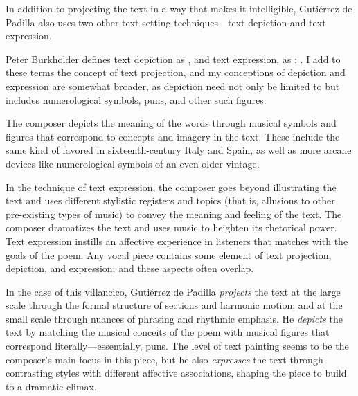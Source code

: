 
In addition to projecting the text in a way that makes it intelligible,
Gutiérrez de Padilla also uses two other text-setting techniques---text
depiction and text expression.%
\begin{Footnote}
    Peter Burkholder defines text depiction as , and text expression, as
    : 
    \Autocite[207]{Burkholder:History}.
    I add to these terms the concept of text projection, and my conceptions of
    depiction and expression are somewhat broader, as depiction need not only
    be limited to  but includes numerological symbols,
    puns, and other such figures.
\end{Footnote}
The composer depicts the meaning of the words through musical symbols and
figures that correspond to concepts and imagery in the text.
These include the same kind of  favored in
sixteenth-century Italy and Spain, as well as more arcane devices like
numerological symbols of an even older vintage.


In the technique of text expression, the composer goes beyond illustrating the
text and uses different stylistic registers and topics (that is, allusions to
other pre-existing types of music) to convey the meaning and feeling of the
text.
The composer dramatizes the text and uses music to heighten its rhetorical
power.
Text expression instills an affective experience in listeners that matches with
the goals of the poem.
Any vocal piece contains some element of text projection, depiction, and
expression; and these aspects often overlap.

In the case of this villancico, Gutiérrez de Padilla \emph{projects} the text at
the large scale through the formal structure of sections and harmonic motion;
and at the small scale through nuances of phrasing and rhythmic emphasis.
He \emph{depicts} the text by matching the musical conceits of the poem with
musical figures that correspond literally---essentially, puns.
The level of text painting seems to be the composer's main focus in this piece,
but he also \emph{expresses} the text through contrasting styles with different
affective associations, shaping the piece to build to a dramatic climax.

